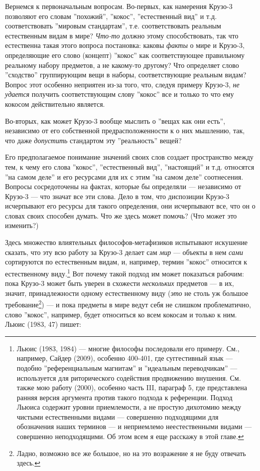 \documentclass[11pt]{book}
\begin{document}
Вернемся к первоначальным вопросам. Во-первых, как намерения Крузо-3 позволяют его словам ''похожий'', ''кокос'', ''естественный вид'' и т.д. соответствовать ''мировым стандартам'', т.е. соответствовать реальным естественным видам в мире? \textit{Что-то} должно этому способствовать, так что естественна такая этого вопроса постановка: каковы \textit{факты} о мире и Крузо-3, определяющие его слово (концепт) ''кокос'' как соответствующее правильному реальному набору предметов, а не какому-то другому? Что определяет слово ''сходство'' группирующим вещи в наборы, соответствующие реальным видам? Вопрос этот особенно неприятен из-за того, что, следуя примеру Крузо-3, \textit{не удается} получить соответствующим слову ''кокос'' все и только то что ему кокосом действительно является.

Во-вторых, как может Крузо-3 вообще мыслить о ''вещах как они есть'', независимо от его собственной предрасположенности к о них мышлению, так, что даже \textit{допустить} стандартом эту ''реальность'' вещей?

Его предполагаемое понимание значений своих слов создает пространство между тем, к чему его слова ''кокос'', ''естественный вид'', ''настоящий'' и т.д. относятся ''на самом деле'' и его ресурсами для их с этим ''на самом деле'' соотнесения. Вопросы сосредоточены на фактах, которые бы определяли --- независимо от Крузо-3 --- что значат все эти слова. Дело в том, что диспозиции Крузо-3 исчерпывают его ресурсы для такого определения, они исчерпывают все, что он о словах своих способен думать. Что же здесь может помочь? (Что может это изменить?)

Здесь множество влиятельных философов-метафизиков испытывают искушение сказать, что эту всю работу за Крузо-3 делает сам \textit{мир} --- объекты в нем \textit{сами} сортируются по естественным видам, и, например, термин ''кокос'' относится к естественному виду.\footnote{Льюис (1983, 1984) --- многие философы последовали его примеру. См., например, Сайдер (2009), особенно 400-401, где суггестивный язык --- подобно ''референциальным магнитам'' и ''идеальным переводчикам'' --- используется для риторического содействия продвижению внушения. См. также мою работу (2000), особенно часть III, параграф 5, где представлена ранняя версия аргумента против такого подхода к референции. Подход Льюиса содержит уровни приемлемости, а не простую дихотомию между чистыми естественными видами --- совершенно подходящими для обозначения наших терминов --- и неприемлемо неестественными видами --- совершенно неподходящими. Об этом всем я еще расскажу в этой главе.} Вот почему такой подход им может показаться рабочим: пока Крузо-3 может быть уверен в схожести \textit{нескольких} предметов --- в их, значит, принадлежности одному естественному виду (\textit{это} не столь уж большое требование\footnote{Ладно, возможно все же большое, но на это возражение я не буду отвечать здесь.}) --- и пока предметы в мире ведут себя не слишком проблематично, слово ''кокос'', например, будет относиться ко всем кокосам и только к ним. Льюис (1983, 47) пишет:
\end{document}
